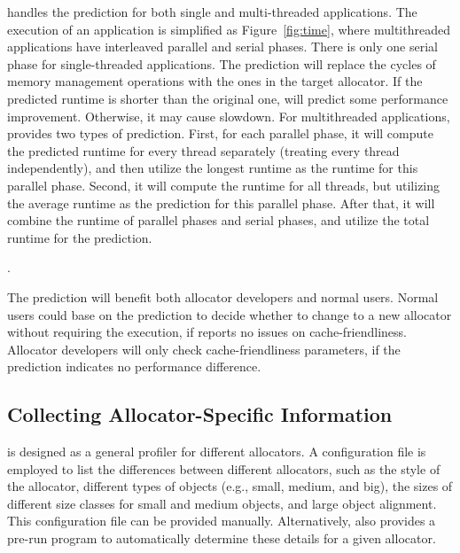 \MP{} handles the prediction for both single and multi-threaded applications. The execution of an application is simplified as Figure~\ref{fig:time}, where multithreaded applications have interleaved parallel and serial phases. There is only one serial phase for single-threaded applications. The prediction will replace the cycles of memory management operations with the ones in the target allocator. If the predicted runtime is shorter than the original one, \MP{} will predict some performance improvement. Otherwise, it may cause slowdown. For multithreaded applications, \MP{} provides two types of prediction. First, for each parallel phase, it will compute the predicted runtime for every thread separately (treating every thread independently), and then utilize the longest runtime as the runtime for this parallel phase. Second, it will compute the runtime for all threads, but utilizing the average runtime as the prediction for this parallel phase. After that, it will combine the runtime of parallel phases and serial phases, and utilize the total runtime for the prediction. 


.

The prediction will benefit both allocator developers and normal users. Normal users could base on the prediction to decide whether to change to a new allocator without requiring the execution, if \MP{} reports no issues on cache-friendliness. Allocator developers will only check cache-friendliness parameters, if the prediction indicates no performance difference. 

\subsection{Collecting Allocator-Specific Information}
\label{sec:understandingallocators}

\MP{} is designed as a general profiler for different allocators. A configuration file is employed to list the differences between different allocators, such as the style of the allocator, different types of objects (e.g., small, medium, and big), the sizes of different size classes for small and medium objects, and large object alignment. This configuration file can be provided manually. Alternatively, \MP{} also provides a pre-run program to automatically determine these details for a given allocator.

